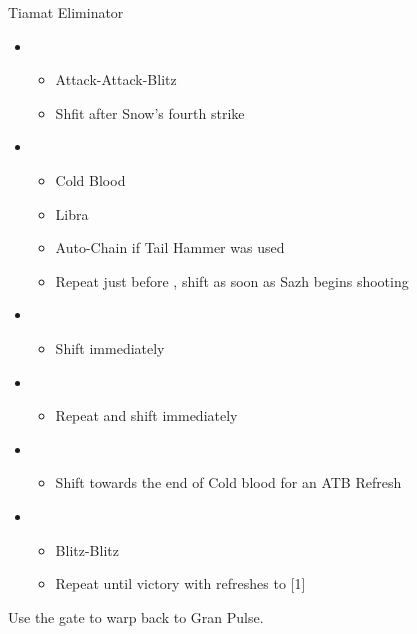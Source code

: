 \begin{battle}{Tiamat Eliminator}
	\begin{itemize}
		\item \third
			\begin{itemize}
				\item Attack-Attack-Blitz
				\item Shfit after Snow's fourth strike
			\end{itemize}
		\item \sixth
			\begin{itemize}
				\item Cold Blood
				\item Libra
				\item Auto-Chain if Tail Hammer was used
				\item Repeat just before \stagger, shift as soon as Sazh begins shooting
			\end{itemize}
		\item \fifth
			\begin{itemize}
				\item Shift immediately
			\end{itemize}
		\item \sixth
			\begin{itemize}
				\item Repeat and shift immediately
			\end{itemize}
		\item \first
			\begin{itemize}
				\item Shift towards the end of Cold blood for an ATB Refresh
			\end{itemize}
		\item \second
			\begin{itemize}
				\item Blitz-Blitz
				\item Repeat until victory with refreshes to [1]
			\end{itemize}
	\end{itemize}
\end{battle}

Use the gate to warp back to Gran Pulse.
